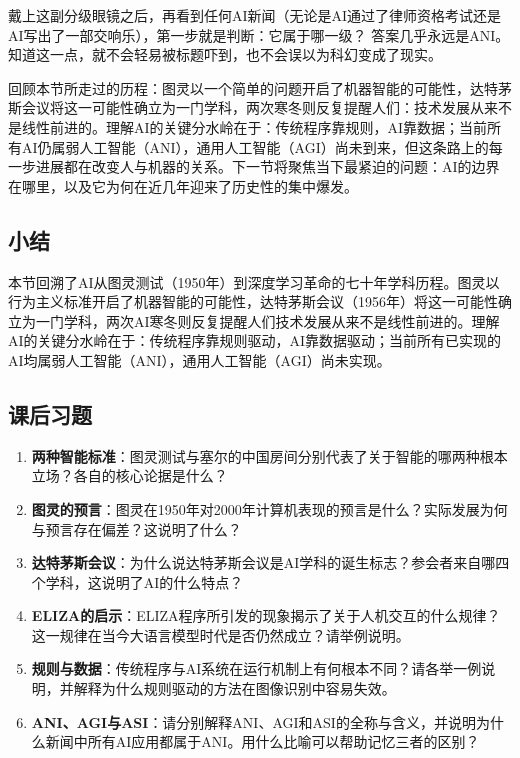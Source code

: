 戴上这副分级眼镜之后，再看到任何AI新闻（无论是AI通过了律师资格考试还是AI写出了一部交响乐），第一步就是判断：它属于哪一级？
答案几乎永远是ANI。知道这一点，就不会轻易被标题吓到，也不会误以为科幻变成了现实。

回顾本节所走过的历程：图灵以一个简单的问题开启了机器智能的可能性，达特茅斯会议将这一可能性确立为一门学科，两次寒冬则反复提醒人们：技术发展从来不是线性前进的。理解AI的关键分水岭在于：传统程序靠规则，AI靠数据；当前所有AI仍属弱人工智能（ANI），通用人工智能（AGI）尚未到来，但这条路上的每一步进展都在改变人与机器的关系。下一节将聚焦当下最紧迫的问题：AI的边界在哪里，以及它为何在近几年迎来了历史性的集中爆发。

\bigskip
\subsection*{小结}

本节回溯了AI从图灵测试（1950年）到深度学习革命的七十年学科历程。图灵以行为主义标准开启了机器智能的可能性，达特茅斯会议（1956年）将这一可能性确立为一门学科，两次AI寒冬则反复提醒人们技术发展从来不是线性前进的。理解AI的关键分水岭在于：传统程序靠规则驱动，AI靠数据驱动；当前所有已实现的AI均属弱人工智能（ANI），通用人工智能（AGI）尚未实现。

\bigskip
\subsection*{课后习题}
\begin{enumerate}
\setlength{\itemsep}{6pt}

\item \textbf{两种智能标准}：图灵测试与塞尔的中国房间分别代表了关于智能的哪两种根本立场？各自的核心论据是什么？

\item \textbf{图灵的预言}：图灵在1950年对2000年计算机表现的预言是什么？实际发展为何与预言存在偏差？这说明了什么？

\item \textbf{达特茅斯会议}：为什么说达特茅斯会议是AI学科的诞生标志？参会者来自哪四个学科，这说明了AI的什么特点？

\item \textbf{ELIZA的启示}：ELIZA程序所引发的现象揭示了关于人机交互的什么规律？这一规律在当今大语言模型时代是否仍然成立？请举例说明。

\item \textbf{规则与数据}：传统程序与AI系统在运行机制上有何根本不同？请各举一例说明，并解释为什么规则驱动的方法在图像识别中容易失效。

\item \textbf{ANI、AGI与ASI}：请分别解释ANI、AGI和ASI的全称与含义，并说明为什么新闻中所有AI应用都属于ANI。用什么比喻可以帮助记忆三者的区别？

\end{enumerate}

